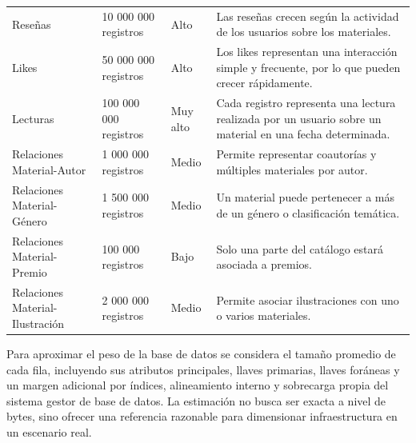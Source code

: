 \documentclass[12pt,a4paper]{article}
\begin{document}
\begin{longtable}{p{4cm} p{3.2cm} p{3.5cm} p{3.5cm}}
Reseñas & 10 000 000 registros & Alto & Las reseñas crecen según la actividad de los usuarios sobre los materiales. \\

Likes & 50 000 000 registros & Alto & Los likes representan una interacción simple y frecuente, por lo que pueden crecer rápidamente. \\

Lecturas & 100 000 000 registros & Muy alto & Cada registro representa una lectura realizada por un usuario sobre un material en una fecha determinada. \\

Relaciones Material-Autor & 1 000 000 registros & Medio & Permite representar coautorías y múltiples materiales por autor. \\

Relaciones Material-Género & 1 500 000 registros & Medio & Un material puede pertenecer a más de un género o clasificación temática. \\

Relaciones Material-Premio & 100 000 registros & Bajo & Solo una parte del catálogo estará asociada a premios. \\

Relaciones Material-Ilustración & 2 000 000 registros & Medio & Permite asociar ilustraciones con uno o varios materiales. \\

\bottomrule
\end{longtable}

Para aproximar el peso de la base de datos se considera el tamaño promedio de cada fila, incluyendo sus atributos principales, llaves primarias, llaves foráneas y un margen adicional por índices, alineamiento interno y sobrecarga propia del sistema gestor de base de datos. La estimación no busca ser exacta a nivel de bytes, sino ofrecer una referencia razonable para dimensionar infraestructura en un escenario real.
\end{document}

